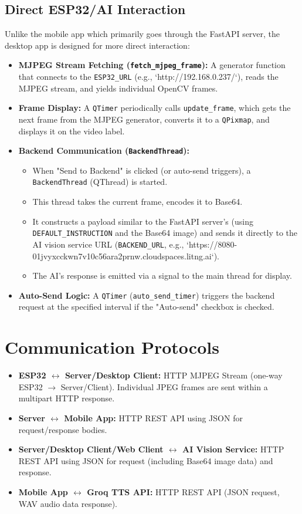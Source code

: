 \documentclass[12pt, a4paper]{report}
\begin{document}
\subsection{Direct ESP32/AI Interaction}
Unlike the mobile app which primarily goes through the FastAPI server, the desktop app is designed for more direct interaction:
\begin{itemize}
    \item \textbf{MJPEG Stream Fetching (\texttt{fetch\_mjpeg\_frame}):} A generator function that connects to the \texttt{ESP32\_URL} (e.g., `http://192.168.0.237/`), reads the MJPEG stream, and yields individual OpenCV frames.
    \item \textbf{Frame Display:} A \texttt{QTimer} periodically calls \texttt{update\_frame}, which gets the next frame from the MJPEG generator, converts it to a \texttt{QPixmap}, and displays it on the video label.
    \item \textbf{Backend Communication (\texttt{BackendThread}):}
        \begin{itemize}
            \item When "Send to Backend" is clicked (or auto-send triggers), a \texttt{BackendThread} (QThread) is started.
            \item This thread takes the current frame, encodes it to Base64.
            \item It constructs a payload similar to the FastAPI server's (using \texttt{DEFAULT\_INSTRUCTION} and the Base64 image) and sends it directly to the AI vision service URL (\texttt{BACKEND\_URL}, e.g., `https://8080-01jvyxcckwn7v10c56ara2prnw.cloudspaces.litng.ai`).
            \item The AI's response is emitted via a signal to the main thread for display.
        \end{itemize}
    \item \textbf{Auto-Send Logic:} A \texttt{QTimer} (\texttt{auto\_send\_timer}) triggers the backend request at the specified interval if the "Auto-send" checkbox is checked.
\end{itemize}

\section{Communication Protocols}
\begin{itemize}
    \item \textbf{ESP32 $\leftrightarrow$ Server/Desktop Client:} HTTP MJPEG Stream (one-way ESP32 $\rightarrow$ Server/Client). Individual JPEG frames are sent within a multipart HTTP response.
    \item \textbf{Server $\leftrightarrow$ Mobile App:} HTTP REST API using JSON for request/response bodies.
    \item \textbf{Server/Desktop Client/Web Client $\leftrightarrow$ AI Vision Service:} HTTP REST API using JSON for request (including Base64 image data) and response.
    \item \textbf{Mobile App $\leftrightarrow$ Groq TTS API:} HTTP REST API (JSON request, WAV audio data response).
\end{itemize}
\end{document}

